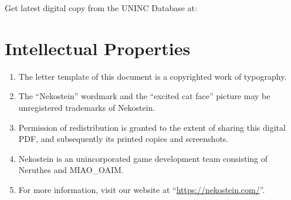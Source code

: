 


\vfill

\small
\strut Get latest digital copy from the UNINC Database at:\par
\strut 



\clearpage
\rmfamily\normalsize








\fakenewdoc
{}


\makeeof
\clearpage





\fakenewdoc
{}


\makeeof
\clearpage





\fakenewdoc
{}


\section{Intellectual Properties}
\begin{enumerate}
    \item The letter template of this document is a copyrighted work of typography.
    \item The ``Nekostein'' wordmark and the ``excited cat face'' picture may be unregistered trademarks of Nekostein.
    \item Permission of redistribution is granted to the extent of sharing this digital PDF,
        and subsequently its printed copies and screenshots.
    \item Nekostein is an unincorporated game development team consisting of Neruthes and MIAO\_OAIM.
    \item For more information, visit our website at ``\href{https://nekostein.com/}{https://nekostein.com/}''.
\end{enumerate}

